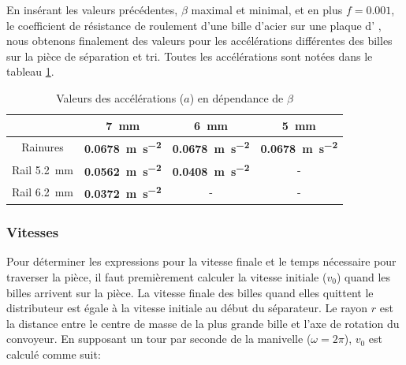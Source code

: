 En insérant les valeurs précédentes, $\beta$ maximal et minimal, et en plus $f = \num{0.001}$, le coefficient de résistance de roulement d'une bille d'acier sur une plaque d'%
, nous obtenons finalement des valeurs pour les accélérations différentes des billes sur la pièce de séparation et tri. Toutes les accélérations sont notées dans le tableau \ref{tab:accelerations_sphere}.

\begin{table}[htbp]
    \centering
    \begin{tabular}{|c|c|c|c|}
        \hline
         & \SI{7}{\mm} & \SI{6}{\mm} & \SI{5}{\mm} \\
        \hline
        Rainures & \textbf{\SI{0.0678}{\m\per\s\squared}} & \textbf{\SI{0.0678}{\m\per\s\squared}} & \textbf{\SI{0.0678}{\m\per\s\squared}} \\
        \hline
        Rail \SI{5.2}{\mm}& \textbf{\SI{0.0562}{\m\per\s\squared}} & \textbf{\SI{0.0408}{\m\per\s\squared}} & - \\
        \hline
        Rail \SI{6.2}{\mm}& \textbf{\SI{0.0372}{\m\per\s\squared}} & - & - \\
        \hline
    \end{tabular}
    \caption{Valeurs des accélérations ($a$) en dépendance de $\beta$}
    \label{tab:accelerations_sphere}
\end{table}

\subsubsection{Vitesses}



Pour déterminer les expressions pour la vitesse finale et le temps nécessaire pour traverser la pièce, il faut premièrement calculer la vitesse initiale ($v_{0}$) quand les billes arrivent sur la pièce. La vitesse finale des billes quand elles quittent le distributeur est égale à la vitesse initiale au début du séparateur. Le rayon $r$ est la distance entre le centre de masse de la plus grande bille et l'axe de rotation du convoyeur. En supposant un tour par seconde de la manivelle ($\omega = 2\pi$), $v_{0}$ est calculé comme suit:

